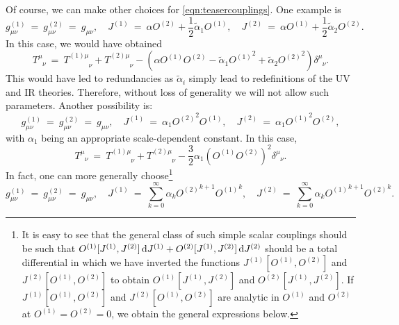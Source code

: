 \documentclass[prd,reprint,a4paper,showpacs,superscriptaddress,11pt,onecolumn,nofootinbib]{revtex4-1}
\renewcommand{\(}{\left(}
\renewcommand{\)}{\right)}
\newcommand{\6}{\partial}
\begin{document}
Of course, we can make other choices for  \eqref{eqn:teasercouplings}. One example is
\begin{equation}\label{eqn:teasercouplings2}
g^{(1)}_{\mu\nu}  ~ = ~ g^{(2)}_{\mu\nu}  ~ = ~ g_{\mu\nu}, \quad J^{(1)} ~ = ~ \alpha O^{(2)} + \frac{1}{2}\tilde\alpha_1 O^{(1)}, \quad J^{(2)} ~ = ~ \alpha O^{(1)} + \frac{1}{2}\tilde\alpha_2 O^{(2)}.
\end{equation}
In this case, we would have obtained
\begin{equation}\label{fullTsimple2}
T^\mu_{\phantom{\mu}\nu} ~ = ~ T^{(1)\mu}_{\phantom{(1)\mu}\nu} + T^{(2)\mu}_{\phantom{(2)\mu}\nu} -\left( \alpha O^{(1)}O^{(2)} -\tilde{\alpha}_1{O^{(1)}}^2 + \tilde{\alpha}_2{O^{(2)}}^2\right)  \delta^\mu_{\phantom{\mu}\nu}.
\end{equation}
This would have led to redundancies as $\tilde{\alpha}_i$ simply lead to redefinitions of the UV and IR theories. Therefore, without loss of generality we will not allow such parameters. Another possibility is:
\begin{equation}\label{eqn:teasercouplings3}
g^{(1)}_{\mu\nu}  ~ = ~ g^{(2)}_{\mu\nu}  ~ = ~ g_{\mu\nu}, \quad J^{(1)} ~ = ~ \alpha_1 {O^{(2)}}^2 O^{(1)}, \quad J^{(2)} ~ = ~ \alpha_1 {O^{(1)}}^2 O^{(2)} ,
\end{equation}
with $\alpha_1$ being an appropriate scale-dependent constant. In this case, 
\begin{equation}\label{fullTsimple3}
T^\mu_{\phantom{\mu}\nu} ~ = ~ T^{(1)\mu}_{\phantom{(1)\mu}\nu} + T^{(2)\mu}_{\phantom{(2)\mu}\nu} -\frac{3}{2}\alpha_1 \left(O^{(1)}O^{(2)}\right)^2 \delta^\mu_{\phantom{\mu}\nu}.
\end{equation}
In fact, one can more generally choose\footnote{It is easy to see that the general class of such simple scalar couplings should be such that $O^{(1)}[J^{(1)}, J^{(2)}]\, {\rm d}J^{(1)}+O^{(2)}[J^{(1)}, J^{(2)}] \,{\rm d}J^{(2)} $ should be a total differential in which we have inverted the functions $J^{(1)}[O^{(1)}, O^{(2)}] $ and $J^{(2)}[O^{(1)}, O^{(2)}] $ to obtain $O^{(1)}[J^{(1)}, J^{(2)}]$ and $O^{(2)}[J^{(1)}, J^{(2)}]$. If $J^{(1)}[O^{(1)}, O^{(2)}] $ and $J^{(2)}[O^{(1)}, O^{(2)}] $ are analytic in $O^{(1)}$ and $O^{(2)}$ at $O^{(1)} = O^{(2)} = 0$, we obtain the general expressions below.}
\begin{equation}\label{eqn:teasercouplingsgen}
g^{(1)}_{\mu\nu}  ~ = ~ g^{(2)}_{\mu\nu}  ~ = ~ g_{\mu\nu}, \quad J^{(1)} ~ = ~ \sum_{k= 0}^\infty\alpha_k {O^{(2)}}^{k+1} {O^{(1)}}^k, \quad J^{(2)} ~ = ~ \sum_{k= 0}^\infty \alpha_k {O^{(1)}}^{k+1} {O^{(2)}}^k.
\end{equation}
\end{document}
